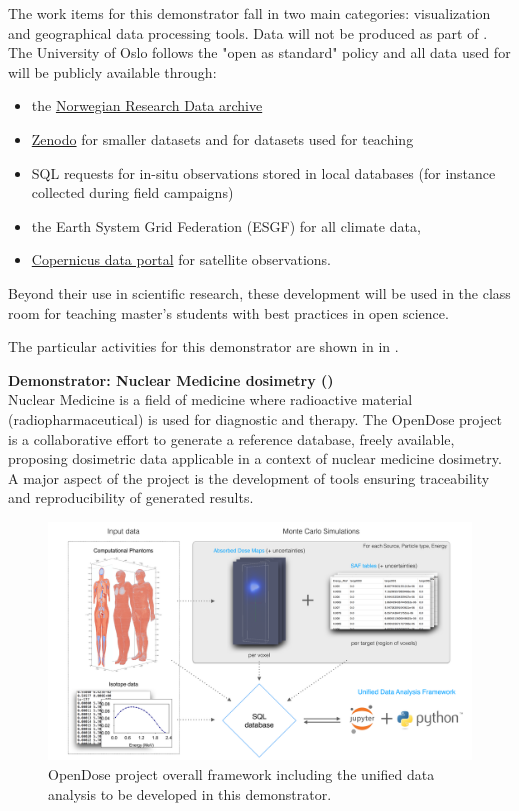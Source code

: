 The work items for this demonstrator fall in two main categories:
visualization and geographical data processing tools. Data will not be produced as part of \TheProject. The University of Oslo follows the "open as standard" policy and all data used for \TheProject will be publicly available through:
\begin{itemize}
\item the \href{https://archive.norstore.no/}{Norwegian Research Data archive}
\item \href{https://zenodo.org/}{Zenodo} for smaller datasets and for datasets used for teaching
\item SQL requests for in-situ observations stored in local databases (for instance collected during field campaigns)
\item the Earth System Grid Federation (ESGF) for all climate data,
\item \href{https://www.copernicus.eu/en/access-data}{Copernicus data portal} for satellite observations.
\end{itemize}


Beyond their use in scientific research, these development will be used in
the class room for teaching master's students with best practices in open
science.

The particular activities for this demonstrator are shown in
   in .

\medskip
\noindent\textbf{Demonstrator: Nuclear Medicine dosimetry ()}\label{sec:concept-demonstrators-opendose}\\
  Nuclear Medicine is a field of medicine where radioactive material
  (radiopharmaceutical) is used for diagnostic and therapy. The OpenDose
  project \cite{Chauvin2017} is a collaborative effort to generate a reference
  database, freely available, proposing dosimetric data applicable in a context
  of nuclear medicine dosimetry.  A major aspect of the project is the
  development of tools ensuring traceability and reproducibility of generated
  results.

  \begin{figure}[ht]
    \centering
    \includegraphics[width=1.0\textwidth]{images/opendose_framework.pdf}
    \caption{OpenDose project overall framework including the unified data
    analysis to be developed in this demonstrator.}
    \label{fig:opendose_framework}
  \end{figure}

